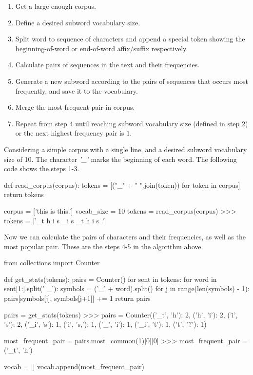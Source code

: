 \begin{enumerate}
    \item Get a large enough corpus.
    \item Define a desired subword vocabulary size.
    \item Split word to sequence of characters and append a special token showing the beginning-of-word or end-of-word affix/suffix respectively.
    \item Calculate pairs of sequences in the text and their frequencies.
    \item Generate a new subword according to the pairs of sequences that occurs most frequently, and save it to the vocabulary.
    \item Merge the most frequent pair in corpus.
    \item Repeat from step 4 until reaching subword vocabulary size (defined in step 2) or the next highest frequency pair is 1.
\end{enumerate}

Considering a simple corpus with a single line, and a desired subword vocabulary size of 10. The character \emph{'\_'} marks the beginning of each word. The following code shows the steps 1-3.

\begin{python}
def read_corpus(corpus):
    tokens = [("_" + " ".join(token)) for token in corpus]
    return tokens

corpus = ['this is this.']
vocab_size = 10
tokens = read_corpus(corpus)
>>> tokens = ['_t h i s _i s _t h i s .']
\end{python}

Now we can calculate the pairs of characters and their frequencies, as well as the most popular pair. These are the steps 4-5 in the algorithm above.

\begin{python}
from collections import Counter

def get_stats(tokens):
    pairs = Counter()
    for sent in tokens:
        for word in sent[1:].split(' _'):
            symbols = ('_' + word).split()
            for j in range(len(symbols) - 1):
                pairs[symbols[j], symbols[j+1]] += 1
    return pairs

pairs = get_stats(tokens)
>>> pairs = Counter({('_t', 'h'): 2, ('h', 'i'): 2, ('i', 's'): 2, 
                    ('_i', 's'): 1, ('i', 's,'): 1, ('_', 'i'): 1, 
                    ('_i', 't'): 1, ('t', '?'): 1})

most_frequent_pair = pairs.most_common(1)[0][0]
>>> most_frequent_pair = ('_t', 'h')

vocab = []
vocab.append(most_frequent_pair)
\end{python}

